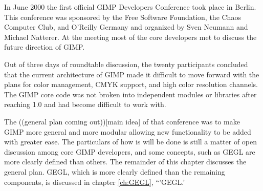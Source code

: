 In June 2000 the first official GIMP Developers Conference took place
in Berlin. This conference was sponsored by the Free Software
Foundation, the Chaos Computer Club, and O'Reilly Germany and
organized by Sven Neumann and Michael Natterer. At the meeting most of
the core developers met to discuss the future direction of GIMP.

Out of three days of roundtable discussion, the twenty participants
concluded that the current architecture of GIMP made it difficult to
move forward with the plans for color management, CMYK support, and
high color resolution channels. The GIMP core code was not broken into
independent modules or libraries after reaching 1.0 and had become
difficult to work with. 

The ((general plan coming out))[main idea] of that conference was to make GIMP more general and more modular allowing new functionality to be added with greater ease. The particulars of how is will be done is still a matter of open discussion among core GIMP developers, and some concepts, such as GEGL are more clearly defined than others. The remainder of this chapter discusses the general plan. GEGL, which is more clearly defined than the remaining components, is discussed in chapter
\ref{ch:GEGL}, ``'GEGL.'
